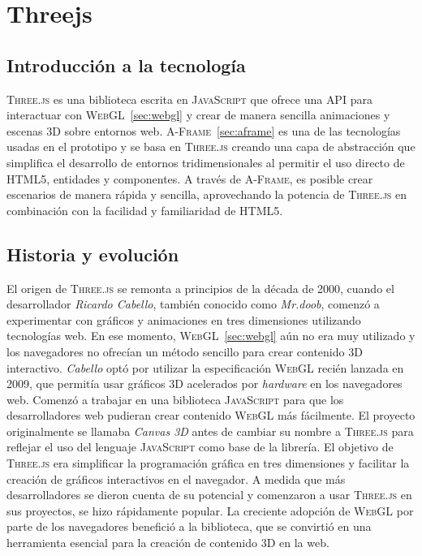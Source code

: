 \documentclass[a4paper, 11pt]{book}
\begin{document}
\section{Threejs}
\label{sec:threejs}
\subsection{Introducción a la tecnología}
\textsc{Three.js} es una biblioteca escrita en \textsc{JavaScript} que ofrece una \textsc{API} para interactuar con \textsc{WebGL}~\ref{sec:webgl} y crear de manera sencilla animaciones y escenas \gls{3D} sobre entornos web. 
\textsc{A-Frame}~\ref{sec:aframe} es una de las tecnologías usadas en el prototipo y se basa en \textsc{Three.js} creando una capa de abstracción que simplifica el desarrollo de entornos tridimensionales al permitir el uso directo de \textsc{HTML5}, entidades y componentes. A través de \textsc{A-Frame}, es posible crear escenarios de manera rápida y sencilla, aprovechando la potencia de \textsc{Three.js} en combinación con la facilidad y familiaridad de \textsc{HTML5}.
\subsection{Historia y evolución}
El origen de \textsc{Three.js} se remonta a principios de la década de 2000, cuando el desarrollador \emph{Ricardo Cabello}, también conocido como \emph{Mr.doob}, comenzó a experimentar con gráficos y animaciones en tres dimensiones utilizando tecnologías web. En ese momento, \textsc{WebGL}~\ref{sec:webgl} aún no era muy utilizado y los navegadores no ofrecían un método sencillo para crear contenido \textsc{3D} interactivo.
\emph{Cabello} optó por utilizar la especificación \textsc{WebGL} recién lanzada en 2009, que permitía usar gráficos \textsc{3D} acelerados por \emph{\gls{hardware}} en los navegadores web. Comenzó a trabajar en una biblioteca \textsc{JavaScript} para que los desarrolladores web pudieran crear contenido \textsc{WebGL} más fácilmente.
El proyecto originalmente se llamaba \emph{Canvas 3D} antes de cambiar su nombre a \textsc{Three.js} para reflejar el uso del lenguaje \textsc{JavaScript} como base de la librería.
El objetivo de \textsc{Three.js} era simplificar la programación gráfica en tres dimensiones y facilitar la creación de gráficos interactivos en el navegador.
A medida que más desarrolladores se dieron cuenta de su potencial y comenzaron a usar \textsc{Three.js} en sus proyectos, se hizo rápidamente popular. La creciente adopción de \textsc{WebGL} por parte de los navegadores benefició a la biblioteca, que se convirtió en una herramienta esencial para la creación de contenido \textsc{3D} en la web.
\end{document}
